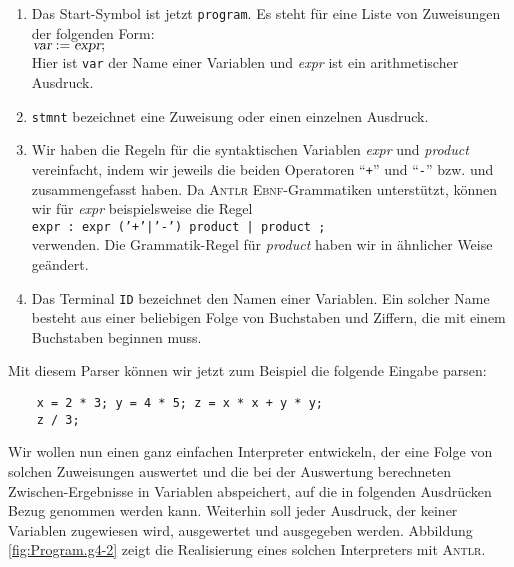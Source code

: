 \begin{enumerate}
\item Das Start-Symbol ist jetzt \texttt{program}.  Es steht f\"ur eine Liste
      von Zuweisungen der folgenden Form:
      \\[0.2cm]
      \hspace*{1.3cm}
      $\textsl{var} \;\mathtt{:=}\; \textsl{expr}\mathtt{;}$
      \\[0.2cm]
      Hier ist \texttt{var} der Name einer Variablen und \textsl{expr} ist ein
      arithmetischer Ausdruck.
\item \texttt{stmnt} bezeichnet eine Zuweisung oder einen einzelnen Ausdruck.
\item Wir haben die Regeln f\"ur die syntaktischen Variablen \textsl{expr} und \textsl{product}
      vereinfacht, indem wir jeweils die beiden Operatoren ``\texttt{+}'' und ``\texttt{-}'' bzw.
      \squoted{*} und \squoted{/} zusammengefasst haben.
      Da \textsc{Antlr} \textsc{Ebnf}-Grammatiken unterst\"utzt, k\"onnen wir f\"ur \textsl{expr}
      beispielsweise die Regel
      \\[0.2cm]
      \hspace*{1.3cm}
      \texttt{expr : expr ('+'|'-') product | product ;}
      \\[0.2cm]
      verwenden.  Die Grammatik-Regel f\"ur \textsl{product} haben wir in \"ahnlicher Weise
      ge\"andert.
\item Das Terminal \texttt{ID} bezeichnet den Namen einer Variablen.  Ein solcher Name
      besteht aus einer beliebigen Folge von Buchstaben und Ziffern, die mit einem Buchstaben 
      beginnen muss.
\end{enumerate}
Mit diesem Parser k\"onnen wir jetzt zum Beispiel die folgende Eingabe parsen:
\begin{verbatim}
    x = 2 * 3; y = 4 * 5; z = x * x + y * y; 
    z / 3;
\end{verbatim}
Wir wollen nun einen ganz einfachen Interpreter entwickeln, der eine Folge von solchen
Zuweisungen auswertet und die bei der Auswertung berechneten Zwischen-Ergebnisse
in Variablen abspeichert, auf die in folgenden Ausdr\"ucken Bezug genommen werden kann.
Weiterhin soll jeder Ausdruck, der keiner Variablen zugewiesen wird, ausgewertet und
ausgegeben werden.  Abbildung \ref{fig:Program.g4-2} zeigt die Realisierung eines solchen
Interpreters mit \textsc{Antlr}.


